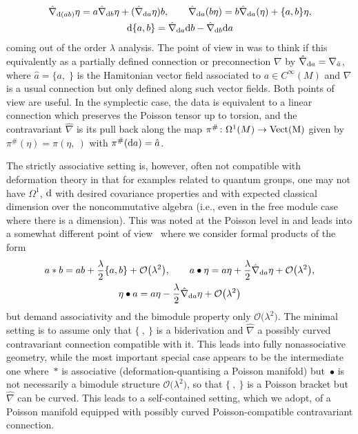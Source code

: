 \documentclass[pdftex]{sigma}
\numberwithin{equation}{section}
\newcommand{\<}{{\langle}}
\renewcommand{\>}{{\rangle}}
\newcommand{\extd}{{\rm d}}
\begin{document}
\begin{gather*} \hat\nabla_{\extd(ab)}\eta=a\hat\nabla_{\extd b}\eta+ (\hat\nabla_{\extd a}\eta) b,\qquad \hat\nabla_{\extd a}(b\eta)=b\hat\nabla_{\extd a}(\eta)+\lbrace a,b\rbrace\eta, \\
\extd\lbrace a,b\rbrace=\hat\nabla_{\extd a}\extd b-\hat\nabla_{\extd b}\extd a\end{gather*}
coming out of the order $\lambda$ analysis. The point of view in \cite{BegMa:sem,BegMa:prg} was to think if this equivalently as a partially defined connection or preconnection $\nabla$ by $\hat\nabla_{\extd a}=\nabla_{\hat a}$, where $\hat{a}=\lbrace a,\;\rbrace$ is the Hamitonian vector field associated to $a\in C^\infty(M)$ and $\nabla$ is a usual connection but only defined along such vector fields. Both points of view are useful. In the symplectic case, the data is equivalent to a linear connection which preserves the Poisson tensor up to torsion, and the contravariant $\hat \nabla$ is its pull back along the map $\pi^\#\colon \Omega^1(M)\to\rm{Vect}(M)$ given by $\pi^\#(\eta)=\pi(\eta,\ )$ with $\pi^\#(\extd a)=\hat a$.

 The strictly associative setting is, however, often not compatible with deformation theory in that for examples related to quantum groups, one may not have $\Omega^1$, $\extd$ with desired covariance properties and with expected classical dimension over the noncommutative algebra (i.e., even in the free module case where there is a dimension). This was noted at the Poisson level in \cite{BegMa:sem, Haw} and leads into a somewhat different point of view~\cite{BegMa:prg} where we consider formal products of the form
\begin{gather} a*b=ab+{\lambda\over 2}\{a,b\}+ \mathcal{O}\big(\lambda^2\big),\qquad a\bullet \eta=a\eta+{\lambda\over 2}\hat\nabla_{\extd a}\eta+\mathcal{O}\big(\lambda^2\big),\nonumber\\
 \eta\bullet a=a\eta-{\lambda\over 2}\hat\nabla_{\extd a}\eta+\mathcal{O}\big(\lambda^2\big)\label{proddef}\end{gather}
but demand associativity and the bimodule property only $\mathcal{O}\big(\lambda^2\big)$. The minimal setting is to assume only that $\{\ ,\ \}$ is a biderivation and $\hat\nabla$ a possibly curved contravariant connection compatible with it. This leads into fully nonassociative geometry, while the most important special case appears to be the intermediate one where~$*$ is associative (deformation-quantising a Poisson manifold) but~$\bullet$ is not necessarily a bimodule structure $\mathcal{O}\big(\lambda^2\big)$, so that $\{\ ,\ \}$ is a Poisson bracket but $\hat\nabla$ can be curved. This leads to a self-contained setting, which we adopt, of a Poisson manifold equipped with possibly curved Poisson-compatible contravariant connection.
\end{document}
